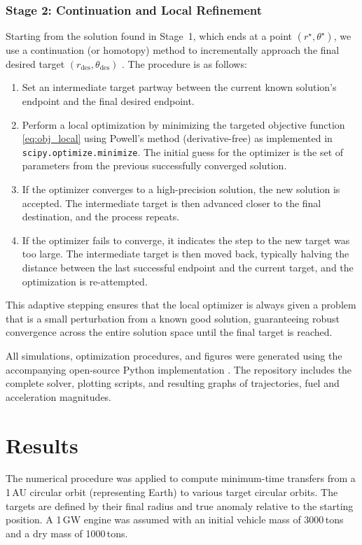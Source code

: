 \documentclass[journal, a4paper]{IEEEtran}
\begin{document}
\subsubsection{Stage 2: Continuation and Local Refinement}
Starting from the solution found in Stage~1, which ends at a point $(r^\star, \theta^\star)$, we use a continuation (or homotopy) method to incrementally approach the final desired target $(r_\text{des}, \theta_\text{des})$ \cite{Allgower1990}. The procedure is as follows:
\begin{enumerate}
    \item Set an intermediate target partway between the current known solution's endpoint and the final desired endpoint.
    \item Perform a local optimization by minimizing the targeted objective function \eqref{eq:obj_local} using Powell's method \cite{Powell1964} (derivative-free) as implemented in \texttt{scipy.optimize.minimize}. The initial guess for the optimizer is the set of parameters from the previous successfully converged solution.
    \item If the optimizer converges to a high-precision solution, the new solution is accepted. The intermediate target is then advanced closer to the final destination, and the process repeats.
    \item If the optimizer fails to converge, it indicates the step to the new target was too large. The intermediate target is then moved back, typically halving the distance between the last successful endpoint and the current target, and the optimization is re-attempted.
\end{enumerate}
This adaptive stepping ensures that the local optimizer is always given a problem that is a small perturbation from a known good solution, guaranteeing robust convergence across the entire solution space until the final target is reached.

All simulations, optimization procedures, and figures were generated using the accompanying open-source Python implementation \cite{Olsina2025}.
The repository includes the complete solver, plotting scripts, and resulting graphs of trajectories, fuel and acceleration magnitudes.

\pagebreak

\section{Results}
The numerical procedure was applied to compute minimum-time transfers from a 1\,AU circular orbit (representing Earth) to various target circular orbits. The targets are defined by their final radius and true anomaly relative to the starting position. A 1\,GW engine was assumed with an initial vehicle mass of 3000\,tons and a dry mass of 1000\,tons.
\end{document}
